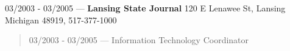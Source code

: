 03/2003 - 03/2005 --- {\bf Lansing State Journal} 120 E Lenawee St, Lansing Michigan 48919, 517-377-1000
\begin{quote}
03/2003 - 03/2005 --- Information Technology Coordinator
\end{quote}
